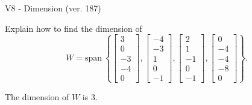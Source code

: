 \begin{exercise}
  \begin{exerciseTitle}V8 - Dimension (ver. 187)\end{exerciseTitle}
  \begin{exerciseStatement}
    Explain how to find the dimension of 
\[W=\mathrm{span}\ \left\{\left[\begin{array}{r}
3 \\
0 \\
-3 \\
-4 \\
0
\end{array}\right] , \left[\begin{array}{r}
-4 \\
-3 \\
1 \\
0 \\
-1
\end{array}\right] , \left[\begin{array}{r}
2 \\
1 \\
-1 \\
0 \\
-1
\end{array}\right] , \left[\begin{array}{r}
0 \\
-4 \\
-4 \\
-8 \\
0
\end{array}\right]\right\}.\]



  \end{exerciseStatement}
  \begin{exerciseAnswer}
   The dimension of \(W\) is  \(3\).
  


  \end{exerciseAnswer}
\end{exercise}